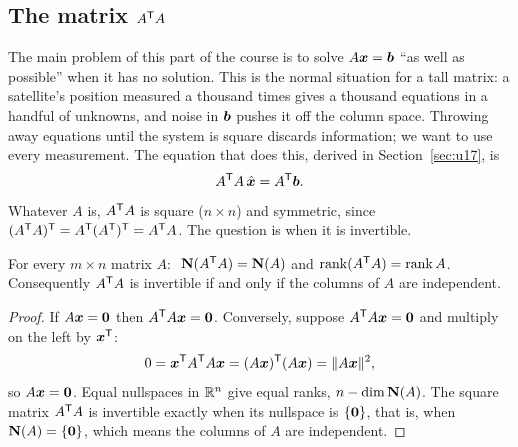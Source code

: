\subsection{The matrix \texorpdfstring{$A^{\mathsf{T}} A$}{A-transpose-A}}

The main problem of this part of the course is to solve $A\boldsymbol{x}=\boldsymbol{b}$ ``as well as
possible'' when it has no solution. This is the normal situation for a tall matrix: a
satellite's position measured a thousand times gives a thousand equations in a handful of
unknowns, and noise in $\boldsymbol{b}$ pushes it off the column space. Throwing away equations until
the system is square discards information; we want to use every measurement. The equation that
does this, derived in Section~\ref{sec:u17}, is
\[
  A^{\mathsf{T}} A\,\hat{\boldsymbol{x}}=A^{\mathsf{T}}\boldsymbol{b}.
\]
Whatever $A$ is, $A^{\mathsf{T}} A$ is square ($n\times n$) and symmetric, since
$(A^{\mathsf{T}} A)^{\mathsf{T}}=A^{\mathsf{T}}(A^{\mathsf{T}})^{\mathsf{T}}=A^{\mathsf{T}} A$. The question is when it is invertible.

\begin{theorem}\label{thm:u16-ata}
For every $m\times n$ matrix $A$: $\ \mathbf{N}(A^{\mathsf{T}} A)=\mathbf{N}(A)$ and $\operatorname{rank}(A^{\mathsf{T}} A)=\operatorname{rank} A$.
Consequently $A^{\mathsf{T}} A$ is invertible if and only if the columns of $A$ are independent.
\end{theorem}

\begin{proof}
If $A\boldsymbol{x}=\boldsymbol{0}$ then $A^{\mathsf{T}} A\boldsymbol{x}=\boldsymbol{0}$. Conversely, suppose $A^{\mathsf{T}} A\boldsymbol{x}=\boldsymbol{0}$ and
multiply on the left by $\boldsymbol{x}^{\mathsf{T}}$:
\[
  0=\boldsymbol{x}^{\mathsf{T}} A^{\mathsf{T}} A\boldsymbol{x}=(A\boldsymbol{x})^{\mathsf{T}}(A\boldsymbol{x})=\|A\boldsymbol{x}\|^2 ,
\]
so $A\boldsymbol{x}=\boldsymbol{0}$. Equal nullspaces in $\mathbb{R}^n$ give equal ranks, $n-\dim\mathbf{N}(A)$. The square
matrix $A^{\mathsf{T}} A$ is invertible exactly when its nullspace is $\{\boldsymbol{0}\}$, that is, when
$\mathbf{N}(A)=\{\boldsymbol{0}\}$, which means the columns of $A$ are independent.
\end{proof}

